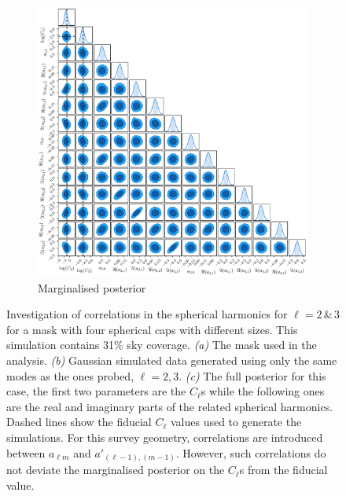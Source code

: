 \begin{figure}
\begin{subfigure}[b]{\textwidth}
 \includegraphics[width=\textwidth]{BPL-FIGS/Blob_fsky_01_trianglePlot.pdf}
  \caption{Marginalised posterior}
  \label{fig:BPL:BlobTriang}
\end{subfigure}
\caption[Investigation of correlation spherical harmonics for $\ell = 2\, \& \, 3$ for a mask with four spherical caps with different sizes containing a 10\% sky fraction]{Investigation of correlations in the spherical harmonics for $\ell = 2\, \& \, 3$ for a mask with four spherical caps with different sizes. This simulation contains 31\% sky coverage. \textit{(a)} The mask used in the analysis. \textit{(b)} Gaussian simulated data generated using only the same modes as the ones probed, $\ell = 2,3$. \textit{(c)} The full posterior for this case, the first two parameters are the $C_{\ell}$s while the following ones are the real and imaginary parts of the related spherical harmonics. Dashed lines show the fiducial $C_{\ell}$ values used to generate the simulations. For this survey geometry, correlations are introduced between $a_{\ell m}$ and $a'_{(\ell-1),(m-1)}$. However, such correlations do not deviate the marginalised posterior on the $C_{\ell}$s from the fiducial value.}
\label{fig:BPL:Blob}
\end{figure}


